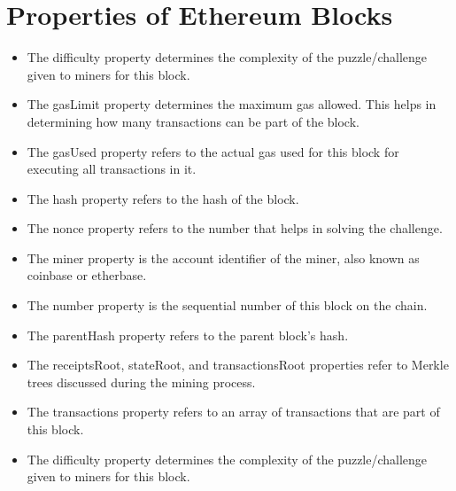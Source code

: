 \section{Properties of Ethereum Blocks}
\begin{itemize}
\item The difficulty property determines the complexity of the puzzle/challenge given to miners for this block.
\item The gasLimit property determines the maximum gas allowed. This helps in determining how many transactions can be part of the block.
\item The gasUsed property refers to the actual gas used for this block for executing all transactions in it.
\item The hash property refers to the hash of the block.
\item The nonce property refers to the number that helps in solving the challenge.
\item The miner property is the account identifier of the miner, also known as coinbase or etherbase.
\item The number property is the sequential number of this block on the chain.
\item The parentHash property refers to the parent block's hash.
\item The receiptsRoot, stateRoot, and transactionsRoot properties refer to Merkle trees discussed during the mining process.
\item The transactions property refers to an array of transactions that are part of this block.
\item The difficulty property determines the complexity of the puzzle/challenge given to miners for this block.
\end{itemize}
